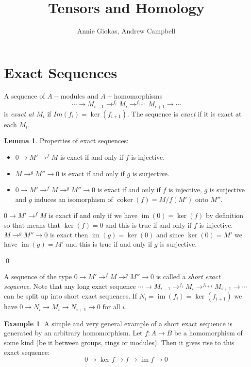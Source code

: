 \documentclass[11pt]{article}
\title{Tensors and Homology}
\author{Annie Giokas, Andrew Campbell}
\theoremstyle{definition}
\newtheorem{example}{Example}[section]
\newtheorem{lemma}[theorem]{Lemma}
\DeclareMathOperator{\Ima}{im}
\DeclareMathOperator{\coker}{coker}
\begin{document}
\maketitle
\section{Exact Sequences}

A sequence of $A-$modules and $A-$homomorphisms 
$$\cdots\rightarrow M_{i-1}\rightarrow^{f_{i}} M_{i}\rightarrow^{f_{i+1}} M_{i+1}\rightarrow \cdots$$ is \textit{exact at} $M_i$ if  $Im(f_i)=\ker(f_{i+1})$.  The sequence is \textit{exact} if it is exact at each $M_i$.

\begin{lemma}
 Properties of exact sequences:\\
\begin{itemize}
    \item $0\rightarrow M' \rightarrow^{f}M$ is exact if and only if $f$ is injective.
    \item $M\rightarrow^{g}M''\rightarrow 0$ is exact if and only if $g$ is surjective.  
    \item $0\rightarrow M' \rightarrow^{f}M\rightarrow^{g}M''\rightarrow 0$ is exact if and only if $f$ is injective, $g$ is surjective and $g$ induces an isomorphism of $\coker(f)=M/f(M')$ onto $M''$.
 \end{itemize}
\end{lemma}
\proof
$0\rightarrow M' \rightarrow^{f}M$ is exact if and only if we have $\Ima(0)=\ker(f)$ by definition so that means that $\ker(f)=0$ and this is true if and only if $f$ is injective. \\

$M\rightarrow^{g}M''\rightarrow 0$ is exact then $\Ima(g) = \ker(0)$ and since $\ker(0)=M'$ we have $\Ima(g) = M'$ and this is true if and only if $g$ is surjective. 

\qed

A sequence of the type $0\rightarrow M' \rightarrow^{f}M\rightarrow^{g}M''\rightarrow 0$ is called a \textit{short exact sequence}. Note  that any long exact sequence $\cdots\rightarrow M_{i-1}\rightarrow^{f_{i}} M_{i}\rightarrow^{f_{i+1}} M_{i+1}\rightarrow \cdots$ can be split up into short exact sequences. If  $N_i=\Ima(f_i)=\ker(f_{i+1})$ we have $0\rightarrow N_i\rightarrow M_i\rightarrow N_{i+1}\rightarrow 0$ for all $i$.

\begin{example}
A simple and very general example of a short exact sequence is generated by an arbitrary homomorphism. Let $f:A\rightarrow B$ be a homomorphism of some kind (be it between groups, rings or modules). Then it gives rise to this exact sequence:
$$0\rightarrow \ker{f}\rightarrow f \rightarrow \Ima{f}\rightarrow 0 $$
\end{example}
\end{document}
